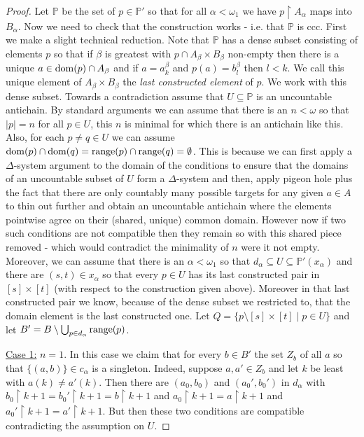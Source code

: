 \documentclass[leqno,11pt]{amsart}
\theoremstyle{definition}
\theoremstyle{remark}
\def\hook{\upharpoonright}
\def\P{\mathbb P}
\begin{document}
\begin{proof}
    Let $\P$ be the set of $p \in \P'$ so that for all $\alpha < \omega_1$ we have $p\hook A_\alpha$ maps into $B_\alpha$. Now we need to check that the construction works - i.e. that $\P$ is ccc. First we make a slight technical reduction. Note that $\P$ has a dense subset consisting of elements $p$ so that if $\beta$ is greatest with $p \cap A_\beta \times B_\beta$ non-empty then there is a unique $a \in {\rm dom}(p) \cap A_\beta$ and if $a = a^\beta_k$ and $p(a) = b^\beta_l$ then $l < k$. We call this unique element of $A_\beta \times B_\beta$ the {\em last constructed element} of $p$. We work with this dense subset. Towards a contradiction assume that $U \subseteq \P$ is an uncountable antichain. By standard arguments we can assume that there is an $n < \omega$ so that $|p| = n$ for all $p \in U$, this $n$ is minimal for which there is an antichain like this. Also, for each $p \neq q \in U$ we can assume ${\rm dom}(p) \cap {\rm dom}(q) = {\rm range}(p) \cap {\rm range}(q) = \emptyset$. This is because we can first apply a $\Delta$-system argument to the domain of the conditions to ensure that the domains of an uncountable subset of $U$ form a $\Delta$-system and then, apply pigeon hole plus the fact that there are only countably many possible targets for any given $a \in A$ to thin out further and obtain an uncountable antichain where the elements pointwise agree on their (shared, unique) common domain. However now if two such conditions are not compatible then they remain so with this shared piece removed - which would contradict the minimality of $n$ were it not empty. Moreover, we can assume that there is an $\alpha < \omega_1$ so that $d_\alpha \subseteq U \subseteq \P'(x_\alpha)$ and there are $(s, t) \in x_\alpha$ so that every $p \in U$ has its last constructed pair in $[s]\times [t]$ (with respect to the construction given above). Moreover in that last constructed pair we know, because of the dense subset we restricted to, that the domain element is the last constructed one. Let $Q = \{p \setminus [s]\times [t] \; | \; p \in U\}$ and let $B' = B \setminus \bigcup_{p \in d_\alpha} {\rm range}(p)$. 

    \noindent \underline{Case 1:} $n = 1$. In this case we claim that for every $b \in B'$ the set $Z_b$ of all $a$ so that $\{(a, b)\} \in c_\alpha$ is a singleton. Indeed, suppose $a, a' \in Z_b$ and let $k$ be least with $a (k) \neq a'(k)$. Then there are $(a_0, b_0)$ and $(a_0', b_0')$ in $d_{\alpha}$ with $b_0 \hook k + 1 = b_0' \hook k+1 = b \hook k+1$ and $a_0 \hook k + 1 = a \hook k+1$ and $a_0'\hook k+1 = a' \hook k+1$. But then these two conditions are compatible contradicting the assumption on $U$. 


\end{proof}
\end{document}
